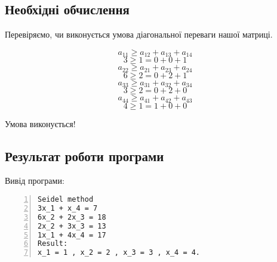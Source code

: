 \documentclass[a4paper, 12pt]{article}
\begin{document}
\subsection{Необхідні обчислення}

Перевіряємо, чи виконується умова діагональної переваги нашої матриці.

\[ a_{11} \geqslant a_{12} + a_{13} + a_{14}\]
\[ 3 \geqslant 1 = 0 + 0+ 1\]
\[ a_{22} \geqslant a_{21} + a_{23} + a_{24}\]
\[ 6 \geqslant 2 = 0 + 2 + 1\]
\[ a_{33} \geqslant a_{31} + a_{32} + a_{34}\]
\[ 3 \geqslant 2 = 0 + 2 + 0\]
\[ a_{44} \geqslant a_{41} + a_{42} + a_{43}\]
\[ 4 \geqslant 1 = 1 + 0 + 0\]

Умова виконується!

\subsection{Результат роботи програми}

Вивід програми:

\begin{Verbatim}[numbers=left,xleftmargin=20mm]
Seidel method
3x_1 + x_4 = 7
6x_2 + 2x_3 = 18
2x_2 + 3x_3 = 13
1x_1 + 4x_4 = 17
Result:
x_1 = 1 , x_2 = 2 , x_3 = 3 , x_4 = 4.
\end{Verbatim}
\end{document}
